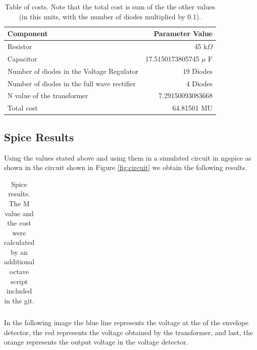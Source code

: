 \begin{table}[h]
  \centering
  \begin{tabular}{|l|r|}
    \hline    
    Component & Parameter Value \\
    \hline
    Resistor & 45 k$\Omega$ \\
    \hline
    Capacitor & 17.5150173805745 $\mu$ F \\
    \hline
    Number of diodes in the Voltage Regulator & 19 Diodes \\
    \hline
    Number of diodes in the full wave rectifier & 4 Diodes \\
    \hline
    N value of the transformer & 7.29150093083668 \\
    \hline
    Total cost & 64.81501 MU \\
    \hline
  \end{tabular}
  \caption{Table of costs. Note that the total cost is sum of the the other values (in this units, with the number of diodes multiplied by 0.1).}
  \label{tab:components}
\end{table}

\subsection{Spice Results}
 Using the values stated above and using them in a simulated circuit in ngspice as shown in the circuit shown in Figure \ref{fig:circuit} we obtain the following results.
 

\begin{table}[h]
  \centering
  \begin{tabular}{|l|r|}
    \hline    
    
  \end{tabular}
  \caption{Spice results. The M value and the cost were calculated by an additional octave script included in the git.}
  \label{tab:info}
\end{table}

\vspace{1cm} 
In the following image the blue line represents the voltage at the of the envelope detector, the red represents the voltage obtained by the transformer, and last, the orange represents the output voltage in the voltage detector.

